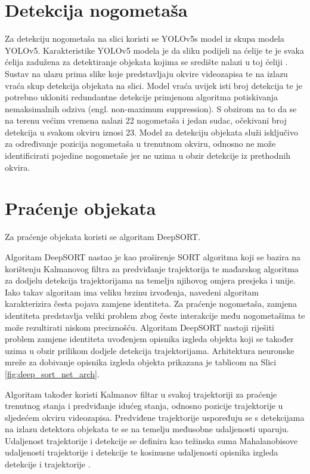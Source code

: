 \documentclass[times, utf8, seminar, numeric]{fer}
\begin{document}
\section{Detekcija nogometaša}
Za detekciju nogometaša na slici koristi se YOLOv5s model iz skupa modela YOLOv5. Karakteristike YOLOv5 modela je da sliku podijeli na ćelije te je svaka ćelija zadužena za detektiranje objekata kojima se središte nalazi u toj ćeliji \cite{yolo}. Sustav na ulazu prima slike koje predstavljaju okvire videozapisa te na izlazu vraća skup detekcija objekata na slici. Model vraća uvijek isti broj detekcija te je potrebno ukloniti redundantne detekcije primjenom algoritma potiskivanja nemaksimalnih odziva (engl. non-maximum suppression). S obzirom na to da se na terenu većinu vremena nalazi 22 nogometaša i jedan sudac, očekivani broj detekcija u svakom okviru iznosi 23. Model za detekciju objekata služi isključivo za određivanje pozicija nogometaša u trenutnom okviru, odnosno ne može identificirati pojedine nogometaše jer ne uzima u obzir detekcije iz prethodnih okvira. 	



\section{Praćenje objekata}
Za praćenje objekata koristi se algoritam DeepSORT.

Algoritam DeepSORT \cite{deepsort} nastao je kao proširenje SORT algoritma koji se bazira na korištenju Kalmanovog filtra za predviđanje trajektorija te mađarskog algoritma za dodjelu detekcija trajektorijama na temelju njihovog omjera presjeka i unije\cite{sort}. Iako takav algoritam ima veliku brzinu izvođenja, navedeni algoritam karakterizira česta pojava zamjene identiteta. Za praćenje nogometaša, zamjena identiteta predstavlja veliki problem zbog česte interakcije među nogometašima te može rezultirati niskom preciznošću. Algoritam DeepSORT nastoji riješiti problem zamjene identiteta uvođenjem opisnika izgleda objekta koji se također uzima u obzir prilikom dodjele detekcija trajektorijama. Arhitektura neuronske mreže za dobivanje opisnika izgleda objekta prikazana je tablicom na Slici \ref{fig:deep_sort_net_arch}.
  
Algoritam također koristi Kalmanov filtar u svakoj trajektoriji za praćenje trenutnog stanja i predviđanje idućeg stanja, odnosno pozicije trajektorije u sljedećem okviru videozapisa. 
Predviđene trajektorije uspoređuju se s detekcijama na izlazu detektora objekata te se na temelju međusobne udaljenosti uparuju.
Udaljenost trajektorije i detekcije se definira kao težinska suma Mahalanobisove udaljenosti trajektorije i detekcije te kosinusne udaljenosti opisnika izgleda detekcije i trajektorije \cite{deepsort}. 
\end{document}
